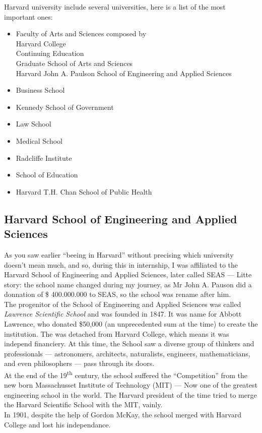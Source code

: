 \documentclass[12pt,a4paper]{article}
\begin{document}
Harvard university include several universities, here is a list of the most important ones:\\
\begin{itemize}
  \item Faculty of Arts and Sciences composed by \\Harvard College \\Continuing Education \\Graduate School of Arts and Sciences \\Harvard John A. Paulson School of Engineering and Applied Sciences
\item Business School
\item Kennedy School of Government
\item Law School
\item Medical School
\item Radcliffe Institute
\item School of Education
\item Harvard T.H. Chan School of Public Health
\end{itemize}


\subsection{Harvard School of Engineering and Applied Sciences}
As you saw earlier ``beeing in Harvard'' without precising which university doesn't mean much, and so, during this in internship, I was affiliated to the Harvard School of Engineering and Applied Sciences, later called SEAS — Litte story: the school name changed during my journey, as Mr John A. Pauson did a donnation of \$ 400.000.000 to SEAS, so the school was rename after him.\\

The progenitor of the School of Engineering and Applied Sciences was called \textit{Lawrence Scientific School} and was founded in 1847. It was name for Abbott Lawrence, who donated \$50,000 (an unprecedented sum at the time) to create the institution. The was detached from Harvard College, which means it was independ financiery.
At this time, the School saw a diverse group of thinkers and professionals — astronomers, architects, naturalists, engineers, mathematicians, and even philosophers — pass through its doors.\\
At the end of the 19\textsuperscript{th} century, the school suffered the ``Competition'' from the new born Massachusset Institute of Technology (MIT) — Now one of the greatest engineering school in the world. The Harvard president of the time tried to merge the Harvard Scientific School with the MIT, vainly.\\
In 1901, despite the help of Gordon McKay, the school merged with Harvard College and lost his independance.\\
\end{document}
